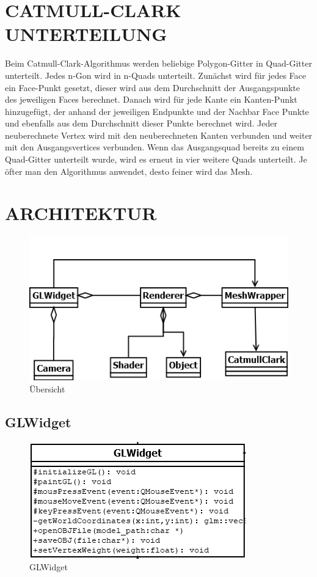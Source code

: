	\section{\Large CATMULL-CLARK UNTERTEILUNG}
	Beim Catmull-Clark-Algorithmus werden beliebige Polygon-Gitter in Quad-Gitter unterteilt. Jedes n-Gon wird in n-Quads unterteilt. Zunächst wird für jedes Face ein Face-Punkt gesetzt, dieser wird aus dem Durchschnitt der Ausgangspunkte des jeweiligen Faces berechnet. Danach wird für jede Kante ein Kanten-Punkt hinzugefügt, der anhand der jeweiligen Endpunkte und der Nachbar Face Punkte und ebenfalls aus dem Durchschnitt dieser Punkte berechnet wird. Jeder neuberechnete Vertex wird mit den neuberechneten Kanten verbunden und weiter mit den Ausgangsvertices verbunden. Wenn das Ausgangsquad bereits zu einem Quad-Gitter unterteilt wurde, wird es erneut in vier weitere Quads unterteilt. Je öfter man den Algorithmus anwendet, desto feiner wird das Mesh.

	\section{\Large ARCHITEKTUR}
	
	\begin{figure}[H]
	\centering
	\includegraphics[width=0.7\linewidth]{uebersicht.png}
	\caption{Übersicht}
	\label{fig1}
	\end{figure}

\subsection{GLWidget}


	\begin{figure}[H]
	\centering
	\includegraphics[width=0.7\linewidth]{GLWidget.png}
	\caption{GLWidget}
	\label{fig2}
	\end{figure}
	
